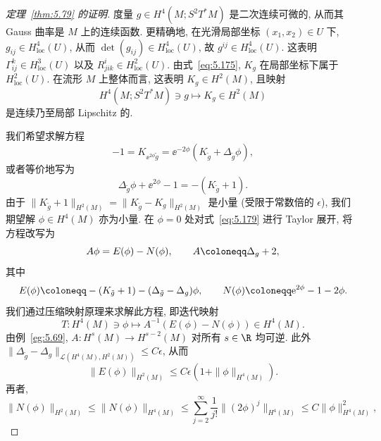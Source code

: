 \begin{proof}[定理~\ref{thm:5.79} 的证明]
度量 $g \in H^4(M; S^2 T^* M)$ 是二次连续可微的, 从而其 Gauss 曲率是 $M$ 上的连续函数. 更精确地, 在光滑局部坐标 $(x_1, x_2) \in U$ 下, $g_{ij} \in H_{\mathrm{loc}}^4(U)$, 从而 $\det(g_{ij}) \in H_{\mathrm{loc}}^4(U)$, 故 $g^{ij} \in H_{\mathrm{loc}}^4(U)$. 这表明 $\Gamma_{ij}^k \in H_{\mathrm{loc}}^3(U)$ 以及 $R_{jik}^i \in H_{\mathrm{loc}}^2(U)$. 由式~\eqref{eq:5.175}, $K_g$ 在局部坐标下属于 $H_{\mathrm{loc}}^2(U)$. 在流形 $M$ 上整体而言, 这表明 $K_g \in H^2(M)$, 且映射
\begin{equation}\label{eq:5.177}
    H^4(M; S^2 T^* M) \ni g \mapsto K_g \in H^2(M)
\end{equation}
是连续乃至局部 Lipschitz 的.

我们希望求解方程
\begin{equation}\label{eq:5.178}
    -1 = K_{\ee^{2\phi} \tilde{g}} = \ee^{-2\phi} (K_{\tilde{g}} + \Delta_{\tilde{g}} \phi),
\end{equation}
或者等价地写为
\begin{equation}\label{eq:5.179}
    \Delta_{\tilde{g}} \phi + \ee^{2\phi} - 1 = -(K_{\tilde{g}} + 1).
\end{equation}
由于 $\|K_{\tilde{g}} + 1\|_{H^2(M)} = \|K_{\tilde{g}} - K_g\|_{H^2(M)}$ 是小量 (受限于常数倍的 $\epsilon$), 我们期望解 $\phi \in H^4(M)$ 亦为小量. 在 $\phi = 0$ 处对式~\eqref{eq:5.179} 进行 Taylor 展开, 将方程改写为
\begin{equation}\label{eq:5.180}
    A \phi = E(\phi) - N(\phi), \qquad A \defeq \Delta_g + 2,
\end{equation}
其中
\[
    E(\phi) \defeq -(K_{\tilde{g}} + 1) - (\Delta_{\tilde{g}} - \Delta_g)\phi, \qquad N(\phi) \defeq \ee^{2\phi} - 1 - 2\phi.
\]
我们通过压缩映射原理来求解此方程, 即迭代映射
\begin{equation}\label{eq:5.181}
    T \colon H^4(M) \ni \phi \mapsto A^{-1}(E(\phi) - N(\phi)) \in H^4(M).
\end{equation}
由例~\ref{eg:5.69}, $A \colon H^s(M) \to H^{s-2}(M)$ 对所有 $s \in \R$ 均可逆. 此外 $\|\Delta_{\tilde{g}} - \Delta_g\|_{\mathcal{L}(H^4(M), H^2(M))} \le C \epsilon$, 从而
\begin{equation}\label{eq:5.182}
    \|E(\phi)\|_{H^2(M)} \le C \epsilon \left( 1 + \|\phi\|_{H^4(M)} \right).
\end{equation}
再者,
\begin{equation}\label{eq:5.183}
    \|N(\phi)\|_{H^2(M)} \le \|N(\phi)\|_{H^4(M)} \le \sum_{j=2}^\infty \frac{1}{j!} \|(2\phi)^j\|_{H^4(M)} \le C \|\phi\|_{H^4(M)}^2,

\end{equation}
\end{proof}
